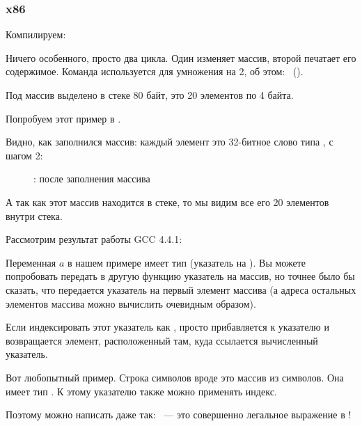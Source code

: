 \subsubsection{x86}


Компилируем:



Ничего особенного, просто два цикла. Один изменяет массив, второй печатает его содержимое. 
Команда  используется для умножения \ECX на 2, об этом: ~().

Под массив выделено в стеке 80 байт, это 20 элементов по 4 байта.

\clearpage
Попробуем этот пример в \olly.
\myindex{\olly}

Видно, как заполнился массив: каждый элемент это 32-битное слово типа \Tint, с шагом 2:

\begin{figure}[H]
\centering
{}
\caption{\olly: после заполнения массива}
\label{fig:array_simple_olly}
\end{figure}

А так как этот массив находится в стеке, то мы видим все его 20 элементов внутри стека.


Рассмотрим результат работы GCC 4.4.1:



Переменная $a$ в нашем примере имеет тип  (указатель на \Tint{}).
Вы можете попробовать передать в другую функцию указатель на массив,
но точнее было бы сказать, что передается указатель на первый элемент массива
(а адреса остальных элементов массива можно вычислить очевидным образом).

Если индексировать этот указатель как ,  просто прибавляется к указателю 
и возвращается элемент, расположенный там, куда ссылается вычисленный указатель.

Вот любопытный пример. Строка символов вроде  это массив из символов. 
Она имеет тип .
К этому указателю также можно применять индекс.

Поэтому можно написать даже так:  ~--- это совершенно легальное выражение в \CCpp!

